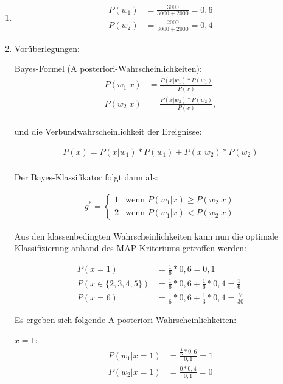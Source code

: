 \documentclass[a4paper,12pt]{article}
\begin{document}
\begin{enumerate}[1.)]

	\item 
	
	\begin{align*}
		P(w_1) &= \frac{3000}{3000+2000} = 0,6 \\
		P(w_2) &= \frac{2000}{3000+2000} = 0,4
	\end{align*}

	\item Vorüberlegungen:
	
	Bayes-Formel (A posteriori-Wahrscheinlichkeiten):
	\begin{align*}
		P(w_1 | x) &= \frac{P(x | w_1) * P(w_1)}{P(x)} \\
		P(w_2 | x) &= \frac{P(x | w_2) * P(w_2)}{P(x)}, \\
	\end{align*}

	und die Verbundwahrscheinlichkeit der Ereignisse: 

	\begin{align*}
		P(x) =  P(x|w_1) * P(w_1) + P(x|w_2) * P(w_2)\\
	\end{align*}

	Der Bayes-Klassifikator folgt dann als:

	\begin{align*}
		g^* =  \begin{cases}
			1 & \text{wenn } P(w_1|x) \geq P(w_2|x) \\
		    2 & \text{wenn } P(w_1|x) < P(w_2|x)
		\end{cases} 
	\end{align*}

	Aus den klassenbedingten Wahrscheinlichkeiten kann nun die optimale Klassifizierung 
	anhand des MAP Kriteriums getroffen werden:

	\begin{align*}
		P(x = 1) &= \frac{1}{6} * 0,6 = 0,1 \\
		P(x \in \{2,3,4,5\}) &= \frac{1}{6} * 0,6 + \frac{1}{6} * 0,4 = \frac{1}{6} \\
		P(x = 6) &= \frac{1}{6} * 0,6 + \frac{1}{3} * 0,4 = \frac{7}{30}
	\end{align*}

	Es ergeben sich folgende A posteriori-Wahrscheinlichkeiten:

	$x = 1$:
	\begin{align*}
		P(w_1 | x=1) &= \frac{\frac{1}{6} * 0,6}{0,1} = 1 \\
		P(w_2 | x=1) &= \frac{0 * 0,4}{0,1} = 0
	\end{align*}


\end{enumerate}
\end{document}
